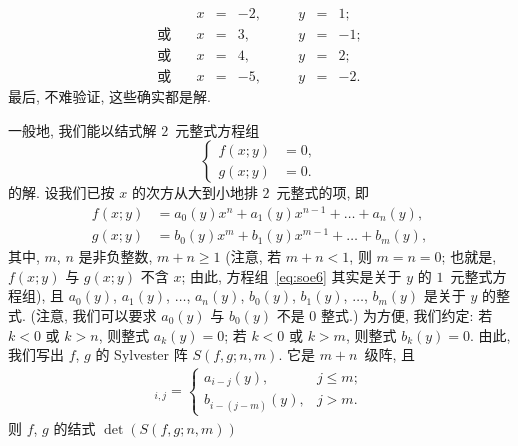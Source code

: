 \documentclass[../libro.tex]{subfiles}
\begin{document}
\begin{example}
\begin{equation*}
        \begin{alignedat}{7}
            {}            & x & {} = {} & {-2}, & \quad & y & {} = {} & 1; \\
            \text{或} \quad & x & {} = {} & 3,    & \quad & y & {} = {} & {-1};              \\
            \text{或} \quad & x & {} = {} & 4,    & \quad & y & {} = {} & 2;                 \\
            \text{或} \quad & x & {} = {} & {-5}, & \quad & y & {} = {} & {-2}.
        \end{alignedat}
    \end{equation*}
    最后, 不难验证, 这些确实都是解.
\end{example}

一般地, 我们能以结式解 \(2\)~元整式方程组
\begin{equation}
    \left\{ %
    \begin{aligned}
        f(x; y) & = 0, \\
        g(x; y) & = 0.
    \end{aligned}
    \right. %
    \label{eq:soe6}
\end{equation}
的解.
设我们已按 \(x\) 的次方从大到小地排 \(2\)~元整式的项, 即
\begin{align*}
    f(x; y) & = a_0 (y) x^n + a_1 (y) x^{n-1} + \dots + a_n (y), \\
    g(x; y) & = b_0 (y) x^m + b_1 (y) x^{m-1} + \dots + b_m (y),
\end{align*}
其中, \(m\), \(n\) 是非负整数,
\(m + n \geq 1\)
(注意, 若 \(m + n < 1\), %
则 \(m = n = 0\);
也就是, \(f(x; y)\) 与 \(g(x; y)\) 不含 \(x\);
由此, 方程组~\eqref{eq:soe6}
其实是关于 \(y\) 的 \(1\)~元整式方程组), %
且 \(a_0 (y)\), \(a_1 (y)\), \(\dots\), \(a_n (y)\),
\(b_0 (y)\), \(b_1 (y)\), \(\dots\), \(b_m (y)\)
是关于 \(y\) 的整式.
(注意, 我们可以要求 \(a_0 (y)\) 与 \(b_0 (y)\)
不是 \(0\) 整式.)
为方便, 我们约定:
若 \(k < 0\) 或 \(k > n\), 则整式 \(a_k (y) = 0\);
若 \(k < 0\) 或 \(k > m\), 则整式 \(b_k (y) = 0\).
由此, 我们写出 \(f\), \(g\) 的 Sylvester 阵
\(S(f, g; n, m)\).
它是 \(m + n\)~级阵, 且
\begin{align*}
    [S(f, g; n, m)]_{i,j} =
    \begin{cases}
        a_{i-j} (y),     & j \leq m; \\
        b_{i-(j-m)} (y), & j > m.
    \end{cases}
\end{align*}
则 \(f\), \(g\) 的结式 \(\det {(S(f, g; n, m))}\)
\end{document}
